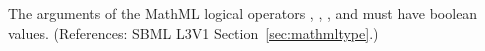 The arguments of the MathML logical operators ,
, , and  must have boolean values.
(References: SBML L3V1 Section~\ref{sec:mathmltype}.)
